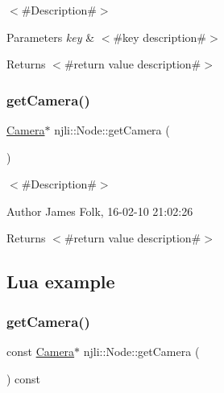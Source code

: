 $<$\#\+Description\#$>$


\begin{DoxyParams}{Parameters}
{\em key} & $<$\#key description\#$>$\\
\hline
\end{DoxyParams}
\begin{DoxyReturn}{Returns}
$<$\#return value description\#$>$ 
\end{DoxyReturn}
\mbox{\label{classnjli_1_1_node_a727867aa2b4c8524cb5f220066848f12}} 
\subsubsection{\texorpdfstring{get\+Camera()}{getCamera()}\hspace{0.1cm}{\footnotesize\ttfamily [1/2]}}
{\footnotesize\ttfamily \mbox{\hyperlink{classnjli_1_1_camera}{Camera}}$\ast$ njli\+::\+Node\+::get\+Camera (\begin{DoxyParamCaption}{ }\end{DoxyParamCaption})}



$<$\#\+Description\#$>$ 

\begin{DoxyAuthor}{Author}
James Folk, 16-\/02-\/10 21\+:02\+:26
\end{DoxyAuthor}
\begin{DoxyReturn}{Returns}
$<$\#return value description\#$>$
\end{DoxyReturn}
\hypertarget{classnjli_1_1_steering_behavior_wander_ex1}{}\subsection{Lua example}\label{classnjli_1_1_steering_behavior_wander_ex1}

\begin{DoxyCodeInclude}
\end{DoxyCodeInclude}
\mbox{\label{classnjli_1_1_node_a187db29f3099dddc9044b7f0c3f4590a}} 
\subsubsection{\texorpdfstring{get\+Camera()}{getCamera()}\hspace{0.1cm}{\footnotesize\ttfamily [2/2]}}
{\footnotesize\ttfamily const \mbox{\hyperlink{classnjli_1_1_camera}{Camera}}$\ast$ njli\+::\+Node\+::get\+Camera (\begin{DoxyParamCaption}{ }\end{DoxyParamCaption}) const}



